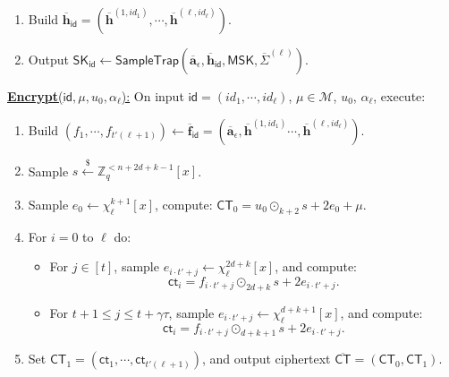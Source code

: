 \documentclass[runningheads]{llncs}
\begin{document}
\begin{description}
\begin{enumerate}

\item Build $\overline{\mathbf{h}}_\mathsf{id}=( \overline{\mathbf{h}}^{(1,id_1)},  \cdots,\overline{\mathbf{h}}^{(\ell,id_{\ell})})$.
\item Output $\mathsf{SK}_{\textsf{id}} \leftarrow \mathsf{SampleTrap}(\overline{\mathbf{a}}_{\epsilon},\overline{\mathbf{h}}_{\mathsf{id}},\mathsf{MSK},\overline{\Sigma}^{(\ell)})$.
\end{enumerate}



\item \underline{\textbf{\textsf{Encrypt}}($\mathsf{id},\mu, u_0, \alpha_\ell$):} On input $\mathsf{id}=(id_1, \cdots, id_\ell)$, $ \mu \in \mathcal{M}$, $u_0$, $\alpha_\ell$, execute:
\begin{enumerate}
\item Build $(f_1, \cdots, f_{t'(\ell+1)}) \leftarrow \overline{\mathbf{f}}_{\mathsf{id}}=(\overline{\mathbf{a}}_{\epsilon}, \overline{\mathbf{h}}^{(1,id_1)} \cdots,\overline{\mathbf{h}}^{(\ell,id_{\ell})}).$
\item Sample $s \xleftarrow[]{\$}\mathbb{Z}_q^{<n+2d+k-1}[x]$. 
\item Sample  $e_0 \leftarrow \chi_{\ell}^{k+1}[x]$, compute: $\mathsf{CT}_{0}=u_0\odot_{k+2}s+2e_0+\mu$.
\item For $i=0$ to $ \ell$ do: 
\begin{itemize}
\item For $j \in [t]$, sample $e_{i\cdot t'+j} \leftarrow \chi_{\ell}^{2d+k}[x]$, and compute:
 $$\textsf{ct}_i=f_{i\cdot t'+j}\odot_{2d+k}s+2e_{i\cdot t'+j}.$$
\item For $t+1 \leq j \leq t+\gamma \tau$, sample $e_{i\cdot t'+j} \leftarrow \chi_{\ell}^{d+k+1}[x]$, and compute: $$\textsf{ct}_i=f_{i\cdot t'+j}\odot_{d+k+1}s+2e_{i\cdot t'+j}.$$
\end{itemize}


\item Set $\mathsf{CT}_{1}=(\textsf{ct}_1, \cdots, \textsf{ct}_{t'(\ell+1)})$, and output ciphertext $\overline{\mathsf{CT}}=(\mathsf{CT}_0, \mathsf{CT}_1)$.
 

\end{enumerate}
\end{description}
\end{document}
